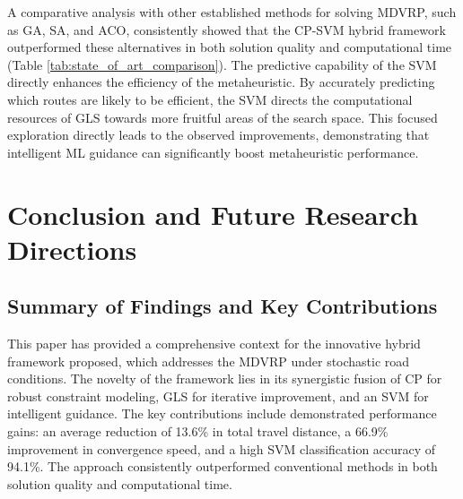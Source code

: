 \documentclass[conference]{IEEEtran} %
\begin{document}
A comparative analysis with other established methods for solving MDVRP, such as GA, SA, and ACO, consistently showed that the CP-SVM hybrid framework outperformed these alternatives in both solution quality and computational time (Table \ref{tab:state_of_art_comparison}). The predictive capability of the SVM directly enhances the efficiency of the metaheuristic. By accurately predicting which routes are likely to be efficient, the SVM directs the computational resources of GLS towards more fruitful areas of the search space. This focused exploration directly leads to the observed improvements, demonstrating that intelligent ML guidance can significantly boost metaheuristic performance.

\begin{table}[ht]
\centering
\caption{Comparison with State-of-the-Art Methods}
\label{tab:state_of_art_comparison}
\end{table}

\section{Conclusion and Future Research Directions}

\subsection{Summary of Findings and Key Contributions}
This paper has provided a comprehensive context for the innovative hybrid framework proposed, which addresses the MDVRP under stochastic road conditions. The novelty of the framework lies in its synergistic fusion of CP for robust constraint modeling, GLS for iterative improvement, and an SVM for intelligent guidance. The key contributions include demonstrated performance gains: an average reduction of 13.6\% in total travel distance, a 66.9\% improvement in convergence speed, and a high SVM classification accuracy of 94.1\%. The approach consistently outperformed conventional methods in both solution quality and computational time.
\end{document}
